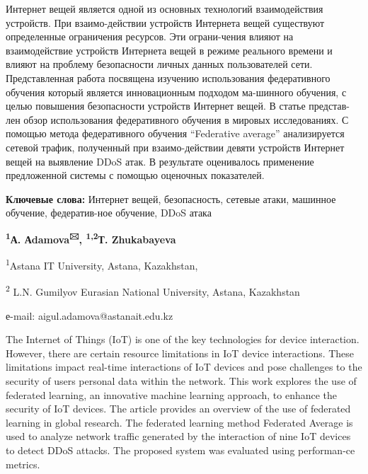 Интернет вещей является одной из основных технологий взаимодействия
устройств. При взаимо-действии устройств Интернета вещей существуют
определенные ограничения ресурсов. Эти ограни-чения влияют на
взаимодействие устройств Интернета вещей в режиме реального времени и
влияют на проблему безопасности личных данных пользователей сети.
Представленная работа посвящена изучению использования федеративного
обучения который является инновационным подходом ма-шинного обучения, с
целью повышения безопасности устройств Интернет вещей. В статье
представ-лен обзор использования федеративного обучения в мировых
исследованиях. С помощью метода федеративного обучения ``Federative
average'' анализируется сетевой трафик, полученный при взаимо-действии
девяти устройств Интернет вещей на выявление DDoS атак. В результате
оценивалось применение предложенной системы с помощью оценочных
показателей.

{\bfseries Ключевые слова:} Интернет вещей, безопасность, сетевые атаки,
машинное обучение, федератив-ное обучение, DDoS атака


\begin{center}
{\bfseries \textsuperscript{1}А. Аdamova\textsuperscript{🖂},
\textsuperscript{1,2}Т. Zhukabayeva}

\textsuperscript{1}Astana IT University, Astana, Kazakhstan,

\textsuperscript{2} L.N. Gumilyov Eurasian National University, Astana,
Kazakhstan

е-mail: aigul.adamova@astanait.edu.kz
\end{center}

The Internet of Things (IoT) is one of the key technologies for device
interaction. However, there are certain resource limitations in IoT
device interactions. These limitations impact real-time interactions of
IoT devices and pose challenges to the security of
users\textquotesingle{} personal data within the network. This work
explores the use of federated learning, an innovative machine learning
approach, to enhance the security of IoT devices. The article provides
an overview of the use of federated learning in global research. The
federated learning method \textquotesingle Federated
Average\textquotesingle{} is used to analyze network traffic generated
by the interaction of nine IoT devices to detect DDoS attacks. The
proposed system was evaluated using performan-ce metrics.

